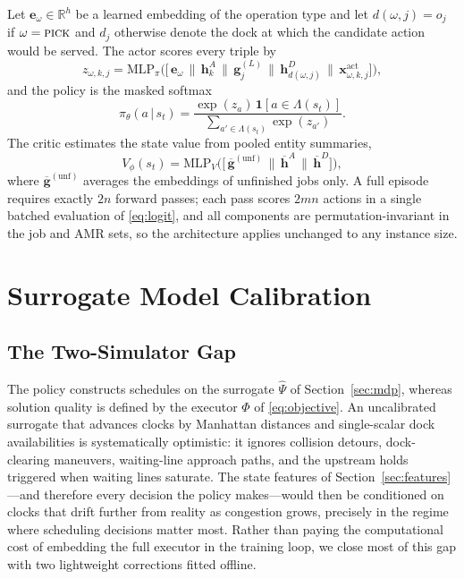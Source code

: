 Let $\bm{e}_{\omega}\in\mathbb{R}^{h}$ be a learned embedding of the
operation type and let $d(\omega,j)=o_j$ if $\omega=\textsc{pick}$ and
$d_j$ otherwise denote the dock at which the candidate action would be
served. The actor scores every triple by
\begin{equation}
z_{\omega,k,j}=\mathrm{MLP}_{\pi}\!\big(\big[\,\bm{e}_{\omega}\,\|\,
\bm{h}^{A}_{k}\,\|\,\bm{g}^{(L)}_{j}\,\|\,
\bm{h}^{D}_{d(\omega,j)}\,\|\,\bm{x}^{\mathrm{act}}_{\omega,k,j}\big]\big),
\label{eq:logit}
\end{equation}
and the policy is the masked softmax
\begin{equation}
\pi_{\theta}(a\,|\,s_t)=
\frac{\exp(z_{a})\,\mathbf{1}[a\in\Lambda(s_t)]}
{\sum_{a'\in\Lambda(s_t)}\exp(z_{a'})}.
\label{eq:policy}
\end{equation}
The critic estimates the state value from pooled entity summaries,
\begin{equation}
V_{\phi}(s_t)=\mathrm{MLP}_{V}\!\big(\big[\,
\overline{\bm{g}}^{\mathrm{(unf)}} \,\|\, \overline{\bm{h}}^{A} \,\|\,
\overline{\bm{h}}^{D}\big]\big),
\label{eq:critic}
\end{equation}
where $\overline{\bm{g}}^{\mathrm{(unf)}}$ averages the embeddings of
unfinished jobs only. A full episode requires exactly $2n$ forward
passes; each pass scores $2mn$ actions in a single batched evaluation
of \eqref{eq:logit}, and all components are permutation-invariant in
the job and AMR sets, so the architecture applies unchanged to any
instance size.


\section{Surrogate Model Calibration}
\label{sec:calibration}

\subsection{The Two-Simulator Gap}

The policy constructs schedules on the surrogate $\hat{\Psi}$ of
Section~\ref{sec:mdp}, whereas solution quality is defined by the
executor $\Phi$ of \eqref{eq:objective}. An uncalibrated surrogate that
advances clocks by Manhattan distances and single-scalar dock
availabilities is systematically optimistic: it ignores collision
detours, dock-clearing maneuvers, waiting-line approach paths, and the
upstream holds triggered when waiting lines saturate. The state
features of Section~\ref{sec:features}---and therefore every decision
the policy makes---would then be conditioned on clocks that drift
further from reality as congestion grows, precisely in the regime where
scheduling decisions matter most. Rather than paying the computational
cost of embedding the full executor in the training loop, we close most
of this gap with two lightweight corrections fitted offline.

